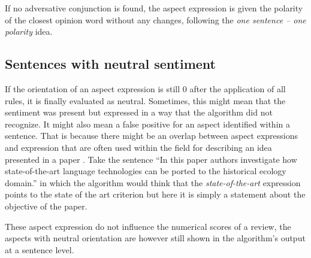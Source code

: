 If no adversative conjunction is found, the aspect expression is given the polarity of the closest opinion word without any changes, following the \textit{one sentence -- one polarity} idea. 

\subsection{Sentences with neutral sentiment}
If the orientation of an aspect expression is still 0 after the application of all rules, it is finally evaluated as neutral. Sometimes, this might mean that the sentiment was present but expressed in a way that the algorithm did not recognize. It might also mean a false positive for an aspect identified within a sentence. That is because there might be an overlap between aspect expressions and expression that are often used within the field for describing an idea presented in a paper . Take the sentence ``In this paper authors investigate how state-of-the-art language technologies can be ported to the historical ecology domain.'' in which the algorithm would think that the \textit{state-of-the-art} expression points to the state of the art criterion but here it is simply a statement about the objective of the paper. 

These aspect expression do not influence the numerical scores of a review, the aspects with neutral orientation are however still shown in the algorithm's output at a sentence level.
